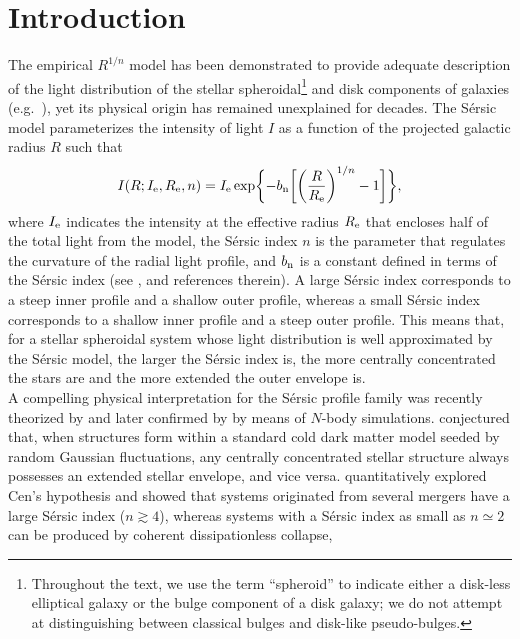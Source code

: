 \documentclass[preprint2]{emulateapj}
\begin{document}
\section{Introduction}
The empirical \cite{sersic1963,sersic1968} $R^{1/n}$ model has been demonstrated to provide adequate description 
of the light distribution of the stellar spheroidal\footnote{Throughout the text, we use the term ``spheroid'' to indicate 
either a disk-less elliptical galaxy or the bulge component of a disk galaxy;  
we do not attempt at distinguishing between classical bulges and disk-like pseudo-bulges. } and disk components of galaxies 
(e.g.~\citealt{caon1993,andredakis1995,iodice1997,iodice1999,seigar1998,khosroshahi2000}), 
yet its physical origin has remained unexplained for decades. 
The S\'ersic model parameterizes the intensity of light $I$ as a function of the projected galactic radius $R$ such that
\begin{equation*}
I(R; I_{\rm e},R_{\rm e},n) = I_{\rm e} \exp \biggl \{ -b_{\rm n} \biggl [ \biggl (\frac{R}{R_{\rm e}} \biggr )^{1/n} -1 \biggr ] \biggr \}, 
\end{equation*}
where $I_{\rm e}$ indicates the intensity at the effective radius $R_{\rm e}$ that encloses half of the total light from the model, 
the S\'ersic index $n$ is the parameter that regulates the curvature of the radial light profile, 
and $b_{\rm n}$ is a constant defined in terms of the S\'ersic index (see \citealt{grahamdriver2005}, and references therein). 
A large S\'ersic index corresponds to a steep inner profile and a shallow outer profile, 
whereas a small S\'ersic index corresponds to a shallow inner profile and a steep outer profile. 
This means that, for a stellar spheroidal system whose light distribution is well approximated by the S\'ersic model, 
the larger the S\'ersic index is, the more centrally concentrated the stars are and the more extended the outer envelope is. \\
A compelling physical interpretation for the S\'ersic profile family was recently theorized by \cite{cen2014} 
and later confirmed by \cite{nipoti2015} by means of $N$-body simulations. 
\cite{cen2014} conjectured that, when structures form within a standard cold dark matter model seeded by random Gaussian fluctuations, 
any centrally concentrated stellar structure always possesses an extended stellar envelope, and vice versa. 
\cite{nipoti2015} quantitatively explored Cen's hypothesis and showed that 
systems originated from several mergers have a large S\'ersic index ($n \gtrsim 4$), 
whereas systems with a S\'ersic index as small as $n \simeq 2$ can be produced by coherent dissipationless collapse, 
\end{document}
